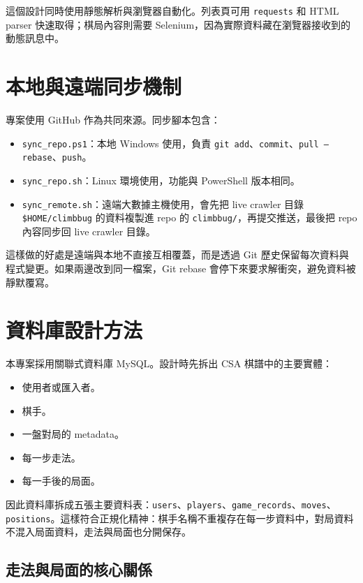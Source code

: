 \documentclass[12pt,a4paper,fontset=none]{ctexart}
\begin{document}
這個設計同時使用靜態解析與瀏覽器自動化。列表頁可用 \texttt{requests} 和 HTML parser 快速取得；棋局內容則需要 Selenium，因為實際資料藏在瀏覽器接收到的動態訊息中。

\section{本地與遠端同步機制}

專案使用 GitHub 作為共同來源。同步腳本包含：

\begin{itemize}
  \item \texttt{sync\_repo.ps1}：本地 Windows 使用，負責 \texttt{git add}、\texttt{commit}、\texttt{pull --rebase}、\texttt{push}。
  \item \texttt{sync\_repo.sh}：Linux 環境使用，功能與 PowerShell 版本相同。
  \item \texttt{sync\_remote.sh}：遠端大數據主機使用，會先把 live crawler 目錄 \texttt{\$HOME/climbbug} 的資料複製進 repo 的 \texttt{climbbug/}，再提交推送，最後把 repo 內容同步回 live crawler 目錄。
\end{itemize}

這樣做的好處是遠端與本地不直接互相覆蓋，而是透過 Git 歷史保留每次資料與程式變更。如果兩邊改到同一檔案，Git rebase 會停下來要求解衝突，避免資料被靜默覆寫。

\section{資料庫設計方法}

本專案採用關聯式資料庫 MySQL。設計時先拆出 CSA 棋譜中的主要實體：

\begin{itemize}
  \item 使用者或匯入者。
  \item 棋手。
  \item 一盤對局的 metadata。
  \item 每一步走法。
  \item 每一手後的局面。
\end{itemize}

因此資料庫拆成五張主要資料表：\texttt{users}、\texttt{players}、\texttt{game\_records}、\texttt{moves}、\texttt{positions}。這樣符合正規化精神：棋手名稱不重複存在每一步資料中，對局資料不混入局面資料，走法與局面也分開保存。

\subsection{走法與局面的核心關係}
\end{document}

